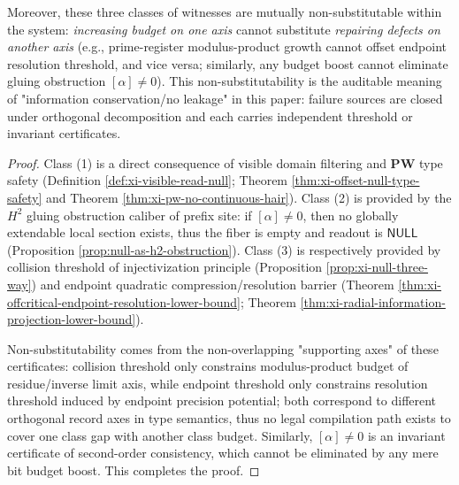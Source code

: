 \begin{theorem}
\begin{enumerate}
\begin{itemize}
  \end{itemize}
\end{enumerate}
Moreover, these three classes of witnesses are mutually non-substitutable within the system: \emph{increasing budget on one axis} cannot substitute \emph{repairing defects on another axis} (e.g., prime-register modulus-product growth cannot offset endpoint resolution threshold, and vice versa; similarly, any budget boost cannot eliminate gluing obstruction \([\alpha]\neq 0\)).
This non-substitutability is the auditable meaning of "information conservation/no leakage" in this paper: failure sources are closed under orthogonal decomposition and each carries independent threshold or invariant certificates.
\end{theorem}

\begin{proof}
Class (1) is a direct consequence of visible domain filtering and \(\mathbf{PW}\) type safety (Definition \ref{def:xi-visible-read-null}; Theorem \ref{thm:xi-offset-null-type-safety} and Theorem \ref{thm:xi-pw-no-continuous-hair}).
Class (2) is provided by the \(H^2\) gluing obstruction caliber of prefix site: if \([\alpha]\neq 0\), then no globally extendable local section exists, thus the fiber is empty and readout is \(\mathsf{NULL}\) (Proposition \ref{prop:null-as-h2-obstruction}).
Class (3) is respectively provided by collision threshold of injectivization principle (Proposition \ref{prop:xi-null-three-way}) and endpoint quadratic compression/resolution barrier (Theorem \ref{thm:xi-offcritical-endpoint-resolution-lower-bound}; Theorem \ref{thm:xi-radial-information-projection-lower-bound}).
\par
Non-substitutability comes from the non-overlapping "supporting axes" of these certificates: collision threshold only constrains modulus-product budget of residue/inverse limit axis, while endpoint threshold only constrains resolution threshold induced by endpoint precision potential; both correspond to different orthogonal record axes in type semantics, thus no legal compilation path exists to cover one class gap with another class budget.
Similarly, \([\alpha]\neq 0\) is an invariant certificate of second-order consistency, which cannot be eliminated by any mere bit budget boost.
This completes the proof.
\end{proof}



